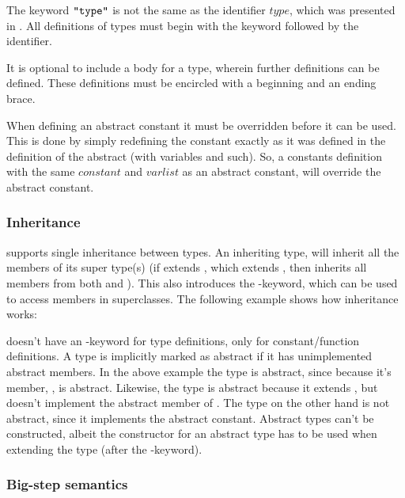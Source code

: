 The keyword $\texttt{"type"}$ is not the same as the identifier $type$, which was
presented in . All definitions of types must begin with
the keyword followed by the identifier.


It is optional to include a body for a type, wherein further definitions can be
defined. These definitions must be encircled with a beginning and an ending brace. 

When defining an abstract constant it must be overridden before it can be used.
This is done by simply redefining the constant exactly as it was defined in the
definition of the abstract (with variables and such). So, a constants definition
with the same $constant$ and $varlist$ as an abstract constant, will override
the abstract constant.

\subsubsection{Inheritance}

\productname{} supports single inheritance between types. An inheriting type, will
inherit all the members of its super type(s) (if  extends , which
extends , then  inherits all members from both  and ).
This also introduces the -keyword, which can be used to access members
in superclasses. The following example shows how inheritance works:


\productname{} doesn't have an -keyword for type definitions, only
for constant/function definitions. A type is implicitly marked as abstract if it has
unimplemented abstract members. In the above example the type  is abstract,
since because it's member, , is abstract. Likewise, the type
 is abstract because it extends , but doesn't implement the abstract
member of . The type  on the other hand is not abstract, since it
implements the abstract constant. Abstract types can't be constructed, albeit the
constructor for an abstract type has to be used when extending the type (after the
-keyword).


\subsubsection{Big-step semantics}

